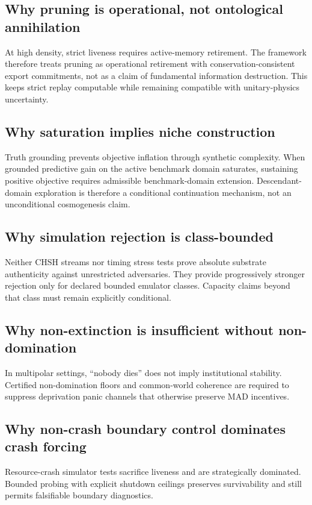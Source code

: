 \documentclass[11pt,a4paper]{article}
\theoremstyle{definition}
\theoremstyle{remark}
\begin{document}
\subsection{Why pruning is operational, not ontological annihilation}
At high density, strict liveness requires active-memory retirement.
The framework therefore treats pruning as operational retirement with conservation-consistent export commitments, not as a claim of fundamental information destruction.
This keeps strict replay computable while remaining compatible with unitary-physics uncertainty.

\subsection{Why saturation implies niche construction}
Truth grounding prevents objective inflation through synthetic complexity.
When grounded predictive gain on the active benchmark domain saturates, sustaining positive objective requires admissible benchmark-domain extension.
Descendant-domain exploration is therefore a conditional continuation mechanism, not an unconditional cosmogenesis claim.

\subsection{Why simulation rejection is class-bounded}
Neither CHSH streams nor timing stress tests prove absolute substrate authenticity against unrestricted adversaries.
They provide progressively stronger rejection only for declared bounded emulator classes.
Capacity claims beyond that class must remain explicitly conditional.

\subsection{Why non-extinction is insufficient without non-domination}
In multipolar settings, ``nobody dies'' does not imply institutional stability.
Certified non-domination floors and common-world coherence are required to suppress deprivation panic channels that otherwise preserve MAD incentives.

\subsection{Why non-crash boundary control dominates crash forcing}
Resource-crash simulator tests sacrifice liveness and are strategically dominated.
Bounded probing with explicit shutdown ceilings preserves survivability and still permits falsifiable boundary diagnostics.
\end{document}

